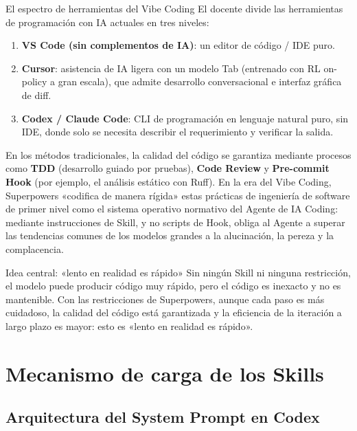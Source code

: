 \documentclass[a4paper]{article}
\begin{document}
\begin{knowledgebox}{El espectro de herramientas del Vibe Coding}
El docente divide las herramientas de programación con IA actuales en tres niveles:
\begin{enumerate}
    \item \textbf{VS Code (sin complementos de IA)}: un editor de código / IDE puro.
    \item \textbf{Cursor}: asistencia de IA ligera con un modelo Tab (entrenado con RL on-policy a gran escala), que admite desarrollo conversacional e interfaz gráfica de diff.
    \item \textbf{Codex / Claude Code}: CLI de programación en lenguaje natural puro, sin IDE, donde solo se necesita describir el requerimiento y verificar la salida.
\end{enumerate}
\end{knowledgebox}

En los métodos tradicionales, la calidad del código se garantiza mediante procesos como \textbf{TDD} (desarrollo guiado por pruebas), \textbf{Code Review} y \textbf{Pre-commit Hook} (por ejemplo, el análisis estático con Ruff). En la era del Vibe Coding, Superpowers «codifica de manera rígida» estas prácticas de ingeniería de software de primer nivel como el sistema operativo normativo del Agente de IA Coding: mediante instrucciones de Skill, y no scripts de Hook, obliga al Agente a superar las tendencias comunes de los modelos grandes a la alucinación, la pereza y la complacencia.

\begin{importantbox}{Idea central: «lento en realidad es rápido»}
Sin ningún Skill ni ninguna restricción, el modelo puede producir código muy rápido, pero el código es inexacto y no es mantenible. Con las restricciones de Superpowers, aunque cada paso es más cuidadoso, la calidad del código está garantizada y la eficiencia de la iteración a largo plazo es mayor: esto es «lento en realidad es rápido».
\end{importantbox}


\section{Mecanismo de carga de los Skills}

\subsection{Arquitectura del System Prompt en Codex}
\end{document}
